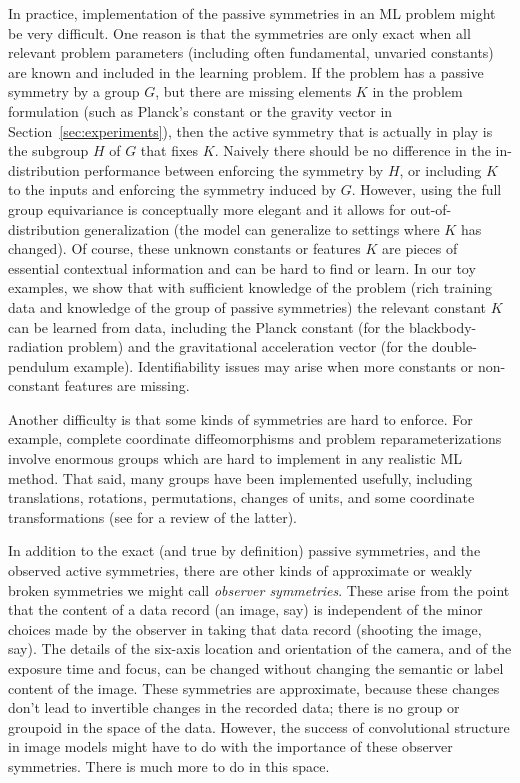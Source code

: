 \documentclass[accepted]{article}
\newcommand{\sectionname}{Section}
\newcommand{\secref}[1]{\sectionname~\ref{#1}}
\begin{document}
In practice, implementation of the passive symmetries in an ML problem might be very difficult.
One reason is that the symmetries are only exact when all relevant problem parameters (including often fundamental, unvaried constants) are known and included in the learning problem.
If the problem has a passive symmetry by a group $G$, but there are missing elements $K$ in the problem formulation (such as Planck's constant or the gravity vector in \secref{sec:experiments}), then the active symmetry that is actually in play is the subgroup $H$ of $G$ that fixes $K$. 
Naively there should be no difference in the in-distribution performance between enforcing the symmetry by $H$, or including $K$ to the inputs and enforcing the symmetry induced by $G$. 
However, using the full group equivariance is conceptually more elegant and it allows for out-of-distribution generalization (the model can generalize to settings where  $K$ has changed).
Of course, these unknown constants or features $K$ are pieces of essential contextual information and can be hard to find or learn. 
In our toy examples, we show that with sufficient knowledge of the problem (rich training data and knowledge of the group of passive symmetries) the relevant constant $K$ can be learned from data, including the Planck constant (for the blackbody-radiation problem) and the gravitational acceleration vector (for the double-pendulum example).
Identifiability issues may arise when more constants or non-constant features are missing.

Another difficulty is that some kinds of symmetries are hard to enforce.
For example, complete coordinate diffeomorphisms and problem reparameterizations involve enormous groups which are hard to implement in any realistic ML method.
That said, many groups have been implemented usefully, including translations, rotations, permutations, changes of units, and some coordinate transformations (see \citealt{weiler} for a review of the latter). 

In addition to the exact (and true by definition) passive symmetries, and the observed active symmetries, there are other kinds of approximate or weakly broken symmetries we might call \emph{observer symmetries}.
These arise from the point that the content of a data record (an image, say) is independent of the minor choices made by the observer in taking that data record (shooting the image, say).
The details of the six-axis location and orientation of the camera, and of the exposure time and focus, can be changed without changing the semantic or label content of the image.
These symmetries are approximate, because these changes don't lead to invertible changes in the recorded data; there is no group or groupoid in the space of the data.
However, the success of convolutional structure in image models might have to do with the importance of these observer symmetries.
There is much more to do in this space.
\end{document}
